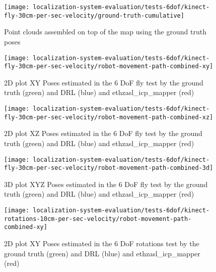 \begin{figure}[H]
	\centering
	\texttt{[image: localization-system-evaluation/tests-6dof/kinect-fly-30cm-per-sec-velocity/ground-truth-cumulative]}
	\caption{Point clouds assembled on top of the map using the ground truth poses}
	\label{fig:localization-system-evaluation_kinect-fly-30cm-per-sec-velocity-gt-cumulative}
\end{figure}


\begin{figure}[H]
	\centering
	\texttt{[image: localization-system-evaluation/tests-6dof/kinect-fly-30cm-per-sec-velocity/robot-movement-path-combined-xy]}
	\caption{2D plot XY Poses estimated in the 6 DoF fly test by the ground truth (green) and DRL (blue) and ethzasl\_icp\_mapper (red)}
	\label{fig:localization-system-evaluation_kinect-fly-robot-movement-path-combined-xy}
\end{figure}

\begin{figure}[H]
	\centering
	\hspace*{0.25cm}\texttt{[image: localization-system-evaluation/tests-6dof/kinect-fly-30cm-per-sec-velocity/robot-movement-path-combined-xz]}
	\caption{2D plot XZ Poses estimated in the 6 DoF fly test by the ground truth (green) and DRL (blue) and ethzasl\_icp\_mapper (red)}
	\label{fig:localization-system-evaluation_kinect-fly-robot-movement-path-combined-xz}
\end{figure}

\begin{figure}[H]
	\centering
	\texttt{[image: localization-system-evaluation/tests-6dof/kinect-fly-30cm-per-sec-velocity/robot-movement-path-combined-3d]}
	\caption{3D plot XYZ Poses estimated in the 6 DoF fly test by the ground truth (green) and DRL (blue) and ethzasl\_icp\_mapper (red)}
	\label{fig:localization-system-evaluation_kinect-fly-robot-movement-path-combined-3d}
\end{figure}


\begin{figure}[H]
	\centering
	\texttt{[image: localization-system-evaluation/tests-6dof/kinect-rotations-10cm-per-sec-velocity/robot-movement-path-combined-xy]}
	\caption{2D plot XY Poses estimated in the 6 DoF rotations test by the ground truth (green) and DRL (blue) and ethzasl\_icp\_mapper (red)}
	\label{fig:localization-system-evaluation_kinect-rotations-robot-movement-path-combined-xy}
\end{figure}

